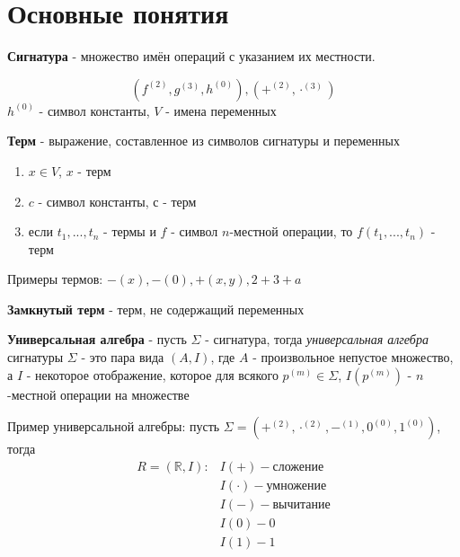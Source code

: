 \documentclass[../main/document.tex]{subfiles}
\begin{document}
\section{Основные понятия}
\begin{dfn}
\textbf{Сигнатура} - множество имён операций с указанием их местности.

$$(f^{(2)},g^{(3)},h^{(0)}), (+^{(2)},\cdot^{(3)})$$
$h^{(0)}$ - символ константы,
$V$ - имена переменных
\end{dfn}

\begin{dfn}
\textbf{Терм} - выражение, составленное из символов сигнатуры и переменных

\begin{enumerate}
\item $x\in V$, $x$ - терм
\item $c$ - символ константы, с - терм
\item если $t_1,...,t_n$ - термы и $f$ - символ $n$-местной операции, то $f(t_1,...,t_n)$ - терм
\end{enumerate}
\end{dfn}

\begin{exm}
Примеры термов: $-(x),-(0),+(x,y),2+3+a$
\end{exm}

\begin{dfn}
\textbf{Замкнутый терм} - терм, не содержащий переменных
\end{dfn}

\begin{dfn}
\textbf{Универсальная алгебра} - пусть $\Sigma$ - сигнатура, тогда \textit{универсальная алгебра} сигнатуры $\Sigma$ - это пара вида $(A,I)$, где $A$ - произвольное непустое множество, а $I$ - некоторое отображение, которое для всякого $p^{(m)}\in \Sigma$, $I(p^{(m)})$ - $n$-местной операции на множестве
\end{dfn}

\begin{exm}
Пример универсальной алгебры: пусть $\Sigma=(+^{(2)},\cdot^{(2)},-^{(1)},0^{(0)},1^{(0)})$, тогда
\begin{equation*}
\begin{split}
R=(\mathbb{R},I) :& I(+) - \text{сложение}\\
& I(\cdot) - \text{умножение}\\
& I(-) - \text{вычитание}\\
& I(0) - 0\\
& I(1) - 1
\end{split}
\end{equation*}
\end{exm}
\end{document}
